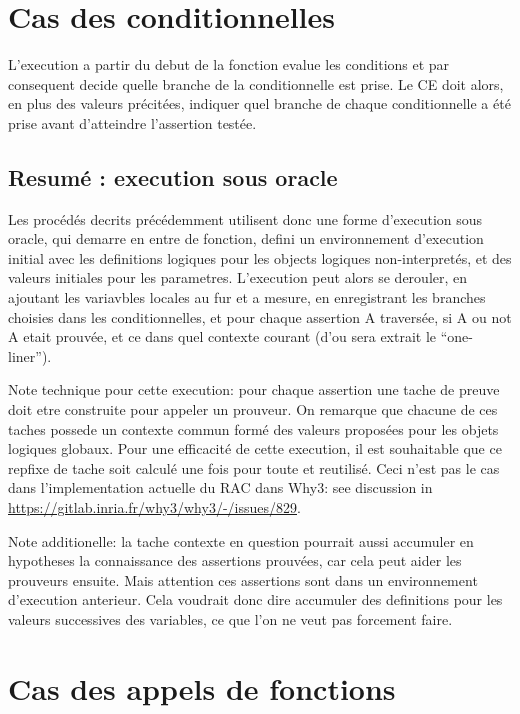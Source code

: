 \documentclass[a4paper,twoside]{article}
\begin{document}
\section{Cas des conditionnelles}

L'execution a partir du debut de la fonction evalue les conditions et par
consequent decide quelle branche de la conditionnelle est prise. Le CE doit
alors, en plus des valeurs précitées, indiquer quel branche de chaque
conditionnelle a été prise avant d'atteindre l'assertion testée.

\subsection{Resumé : execution sous oracle}

Les procédés decrits précédemment utilisent donc une forme d'execution sous oracle,
qui demarre en entre de fonction, defini un environnement d'execution initial
avec les definitions logiques pour les objects logiques non-interpretés, et des
valeurs initiales pour les parametres. L'execution peut alors se derouler, en
ajoutant les variavbles locales au fur et a mesure, en enregistrant les branches
choisies dans les conditionnelles, et pour chaque assertion A traversée, si A ou
not A etait prouvée, et ce dans quel contexte courant (d'ou sera extrait le
``one-liner'').

Note technique pour cette execution: pour chaque assertion une tache de preuve
doit etre construite pour appeler un prouveur. On remarque que chacune de ces
taches possede un contexte commun formé des valeurs proposées pour les objets
logiques globaux. Pour une efficacité de cette execution, il est souhaitable que
ce repfixe de tache soit calculé une fois pour toute et reutilisé. Ceci n'est
pas le cas dans l'implementation actuelle du RAC dans Why3: see discussion in
\url{https://gitlab.inria.fr/why3/why3/-/issues/829}.

Note additionelle: la tache contexte en question pourrait aussi accumuler en
hypotheses la connaissance des assertions prouvées, car cela peut aider les
prouveurs ensuite. Mais attention ces assertions sont dans un environnement
d'execution anterieur. Cela voudrait donc dire accumuler des definitions pour
les valeurs successives des variables, ce que l'on ne veut pas forcement faire.


\section{Cas des appels de fonctions}
\end{document}
